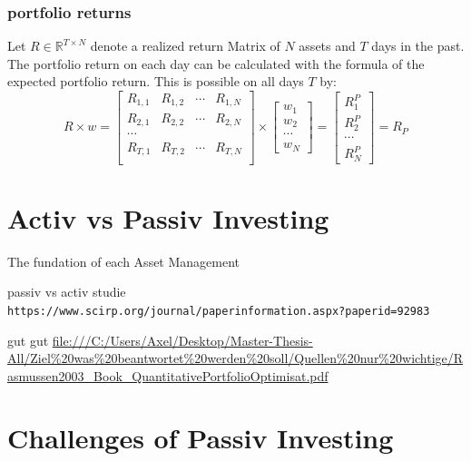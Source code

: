 \documentclass[
  oneside]{book}
\begin{document}
\hypertarget{portfolio-returns}{%
\subsection{portfolio returns}\label{portfolio-returns}}

Let \(R \in \mathbb{R}^{T \times N}\) denote a realized return Matrix of \(N\) assets and \(T\) days in the past. The portfolio return on each day can be calculated with the formula of the expected portfolio return. This is possible on all days \(T\) by:
\[
  R \times w = 
  \begin{bmatrix}
    R_{1, 1} & R_{1, 2} & \cdots & R_{1, N} \\
    R_{2, 1} & R_{2, 2} & \cdots & R_{2, N} \\
    \cdots \\
    R_{T, 1} & R_{T, 2} & \cdots & R_{T, N} \\
 \end{bmatrix}
  \times 
  \begin{bmatrix}
    w_{1} \\ 
    w_{2} \\
    \cdots \\
    w_{N}  
 \end{bmatrix}
 =
   \begin{bmatrix}
    R_{1}^P \\ 
    R_{2}^P \\
    \cdots \\
    R_{N}^P  
 \end{bmatrix}
 =
 R_P
\]

\hypertarget{activ-vs-passiv-investing}{%
\chapter{Activ vs Passiv Investing}\label{activ-vs-passiv-investing}}

The fundation of each Asset Management

passiv vs activ studie
\texttt{https://www.scirp.org/journal/paperinformation.aspx?paperid=92983}

gut gut
\url{file:///C:/Users/Axel/Desktop/Master-Thesis-All/Ziel\%20was\%20beantwortet\%20werden\%20soll/Quellen\%20nur\%20wichtige/Rasmussen2003_Book_QuantitativePortfolioOptimisat.pdf}

\hypertarget{challenges-of-passiv-investing}{%
\chapter{Challenges of Passiv Investing}\label{challenges-of-passiv-investing}}
\end{document}
